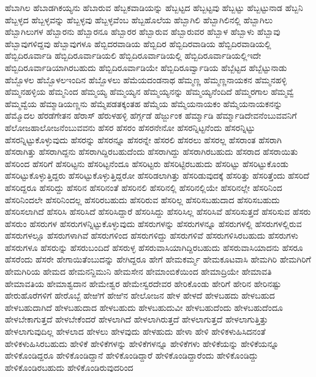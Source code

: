 {ಹೆಬಾಗಿಲ
ಹೆಬಾಡಗಿಕಯ್ಯನು
ಹೆಬಾರುವ
ಹೆಬ್ಬಕವಾಡಿಯನ್ನು
ಹೆಬ್ಬಟ್ಟದ
ಹೆಬ್ಬಟ್ಟವು
ಹೆಬ್ಬಟ್ಟು
ಹೆಬ್ಬಟ್ಟುನಾಡ
ಹೆಬ್ಬನಿ
ಹೆಬ್ಬಳ್ಳದ
ಹೆಬ್ಬಳ್ಳವನ್ನು
ಹೆಬ್ಬಳ್ಳವು
ಹೆಬ್ಬಳ್ಳವೆಂಬ
ಹೆಬ್ಬಹೊಲೆಯ
ಹೆಬ್ಬಾಗಿಲಿ
ಹೆಬ್ಬಾಗಿಲಿನಲ್ಲಿ
ಹೆಬ್ಬಾಗಿಲು
ಹೆಬ್ಬಾಗಿಲುಗಳ
ಹೆಬ್ಬಾರನು
ಹೆಬ್ಬಾರನೂ
ಹೆಬ್ಬಾರರ
ಹೆಬ್ಬಾರುವ
ಹೆಬ್ಬಾರುವರ
ಹೆಬ್ಬಾಳ
ಹೆಬ್ಬಾಳು
ಹೆಬ್ಬಾವು
ಹೆಬ್ಬಾವುಗಳಿದ್ದವು
ಹೆಬ್ಬಾವುಗಳೂ
ಹೆಬ್ಬಿದರವಾಡಿಯ
ಹೆಬ್ಬಿದಿರ
ಹೆಬ್ಬಿದಿರವಾಡಿಯ
ಹೆಬ್ಬಿದಿರವಾಡಿಯಲ್ಲಿ
ಹೆಬ್ಬಿದಿರೂರ್ವಾಡಿ
ಹೆಬ್ಬಿದಿರೂರ್ವಾಡಿಯಲಿ
ಹೆಬ್ಬಿದಿರೂರ್ವಾಡಿಯಲ್ಲಿ
ಹೆಬ್ಬಿದಿರೂರ್ವಾಡಿಯಲ್ಲಿಇದೇ
ಹೆಬ್ಬಿದಿರೂರ್ವಾಡಿಯಾಗಿರಬಹುದು
ಹೆಬ್ಬಿದಿರೂರ್ವಾಡಿಯೇ
ಹೆಬ್ಬಿದಿರೂರ್ವ್ವಾಡಿಯ
ಹೆಬ್ಬೆಟ್ಟದ
ಹೆಬ್ಬೆಟ್ಟುನಾಡು
ಹೆಬ್ಬೊಳಲ
ಹೆಬ್ಬೊಳಲಇಂದಿನ
ಹೆಬ್ಬೊಳಲು
ಹೆಮೆಯದಂಡನಾಥ
ಹೆಮ್ಮಣ್ಣ
ಹೆಮ್ಮಣ್ಣನಾಯಕನ
ಹೆಮ್ಮನಹಳ್ಳಿ
ಹೆಮ್ಮನಹಳ್ಳಿಯ
ಹೆಮ್ಮನಿಂದ
ಹೆಮ್ಮಯ್ಯ
ಹೆಮ್ಮಯ್ಯನ
ಹೆಮ್ಮಯ್ಯನನ್ನು
ಹೆಮ್ಮಯ್ಯನೆಂದಿದೆ
ಹೆಮ್ಮರಗಾಲ
ಹೆಮ್ಮವ್ವೆ
ಹೆಮ್ಮವ್ವೆಯ
ಹೆಮ್ಮಾಡಿಯಣ್ಣನು
ಹೆಮ್ಮೆಪಡತಕ್ಕಂತಹ
ಹೆಮ್ಮೆಯ
ಹೆಮ್ಮೆಯನಾಯಕಂ
ಹೆಮ್ಮೆಯನಾಯಕನನ್ನು
ಹೆಮ್ಮೊದಲ
ಹೆರಡೆಗೇತನ
ಹೆರಾಸ್
ಹೆರುಳಹಳ್ಳಿ
ಹೆರ್ಗ್ಗಡೆ
ಹೆರ್ಜ್ಜುಂಕ
ಹೆರ್ಮ್ಮಾಡಿ
ಹೆರ್ಮ್ಮಾಡಿದೇವನೆಂಬುವವನಿಗೆ
ಹೆಲೋಜಹಾಲೋಜನೆಂಬುವವನು
ಹೆಸರ
ಹೆಸರಂ
ಹೆಸರನೇನೋ
ಹೆಸರನ್ನಿಟ್ಟನೆಂದು
ಹೆಸರನ್ನಿಟ್ಟು
ಹೆಸರನ್ನಿಟ್ಟುಕೊಳ್ಳುವುದು
ಹೆಸರನ್ನು
ಹೆಸರನ್ನೂ
ಹೆಸರನ್ನೇ
ಹೆಸರಲಿ
ಹೆಸರಲು
ಹೆಸರಲ್ಲ
ಹೆಸರಾಂತ
ಹೆಸರಾಗಿ
ಹೆಸರಾಗಿತ್ತು
ಹೆಸರಾಗಿದ್ದನು
ಹೆಸರಾಗಿದ್ದಿರಬಹುದೆಂದು
ಹೆಸರಾಗಿದ್ದು
ಹೆಸರಾಗಿರಬಹುದು
ಹೆಸರಾದ
ಹೆಸರಾಯಿತು
ಹೆಸರಿಂದ
ಹೆಸರಿಗೆ
ಹೆಸರಿಟ್ಟನು
ಹೆಸರಿಟ್ಟನೆಂದೂ
ಹೆಸರಿಟ್ಟರು
ಹೆಸರಿಟ್ಟಿರಬಹುದು
ಹೆಸರಿಟ್ಟು
ಹೆಸರಿಟ್ಟುಕೊಂಡು
ಹೆಸರಿಟ್ಟುಕೊಳ್ಳುತ್ತಿದ್ದರು
ಹೆಸರಿಟ್ಟುಕೊಳ್ಳುತ್ತಿದ್ದರೋ
ಹೆಸರಿಡಲಾಗಿತ್ತು
ಹೆಸರಿಡುವುದಕ್ಕೆ
ಹೆಸರಿತ್ತು
ಹೆಸರಿತ್ತೆಂದು
ಹೆಸರಿದೆ
ಹೆಸರಿದ್ದರೂ
ಹೆಸರಿದ್ದು
ಹೆಸರಿನ
ಹೆಸರಿನಂತೆ
ಹೆಸರಿನಲಿ
ಹೆಸರಿನಲ್ಲಿ
ಹೆಸರಿನಲ್ಲಿಯೇ
ಹೆಸರಿನಲ್ಲೇ
ಹೆಸರಿನಿಂದ
ಹೆಸರಿನಿಂದಲೇ
ಹೆಸರಿನಿಂದಲ್ಲ
ಹೆಸರಿರಬಹುದು
ಹೆಸರಿರುವ
ಹೆಸರಿಲ್ಲ
ಹೆಸರಿಸಬಹುದಾದ
ಹೆಸರಿಸಬಹುದು
ಹೆಸರಿಸಲಾಗಿದೆ
ಹೆಸರಿಸಿ
ಹೆಸರಿಸಿದೆ
ಹೆಸರಿಸಿದ್ದಾರೆ
ಹೆಸರಿಸಿದ್ದು
ಹೆಸರಿಸಿಲ್ಲ
ಹೆಸರಿಸಿವೆ
ಹೆಸರಿಸುತ್ತದೆ
ಹೆಸರಿಸುವ
ಹೆಸರು
ಹೆಸರುಂ
ಹೆಸರುಗಳ
ಹೆಸರುಗಳನ್ನಿಟ್ಟುಕೊಳ್ಳುವುದು
ಹೆಸರುಗಳನ್ನು
ಹೆಸರುಗಳನ್ನೂ
ಹೆಸರುಗಳಲ್ಲಿ
ಹೆಸರುಗಳಲ್ಲಿರುವ
ಹೆಸರುಗಳಲ್ಲೂ
ಹೆಸರುಗಳಾಗಿವೆ
ಹೆಸರುಗಳಿಂದ
ಹೆಸರುಗಳಿದ್ದು
ಹೆಸರುಗಳಿವೆ
ಹೆಸರುಗಳಿಸಿರಬಹುದು
ಹೆಸರುಗಳು
ಹೆಸರುಗಳೂ
ಹೆಸರುನ್ನು
ಹೆಸರುಬಂದಿದೆ
ಹೆಸರುಳ್ಳ
ಹೆಸರುವಾಸಿಯಾಗಿದ್ದಿರಬಹುದು
ಹೆಸರುವಾಸಿಯಾದನು
ಹೆಸರೂ
ಹೆಸರೆಂದು
ಹೆಸರೇ
ಹೇಗಾಯಿತೆಂಬುದನ್ನು
ಹೇಗಿದ್ದರೂ
ಹೇಗೆ
ಹೇಮಕರ್ಮ್ಮ
ಹೇಮಕೂಟವಾಸಿ
ಹೇಮಗಿರಿ
ಹೇಮಗಿರಿಗೆ
ಹೇಮಗಿರಿಯ
ಹೇಮದ
ಹೇಮನನ್ದಿಮುನಿ
ಹೇಮಸೇನ
ಹೇಮಾಂಬಿಕೆಯಿಂದ
ಹೇಮಾದ್ರಿಯೇ
ಹೇಮಾವತಿ
ಹೇಮಾವತಿಯ
ಹೇಮಾಶ್ವದಾನ
ಹೇಮೇಶ್ವರ
ಹೇಮೇಸ್ವರದೇವರ
ಹೇರಿಕೊಂಡು
ಹೇರಿಗೆ
ಹೇರಿನ
ಹೇರಿನಷ್ಟು
ಹೇರುಹೊರೆಗಳಿಗೆ
ಹೇರೊಬ್ಬೆ
ಹೇಱಿಗೆ
ಹೇಱಿನ
ಹೇಲೋಜನ
ಹೇಳ
ಹೇಳದೆ
ಹೇಳಬಹದು
ಹೇಳಬಹುದ
ಹೇಳಬಹುದಾಗಿದೆ
ಹೇಳಬಹುದಾದ
ಹೇಳಬಹುದು
ಹೇಳಬಹುದುವೀ
ಹೇಳಬಹುದೆಂದು
ಹೇಳಬಹುದೆಂದೂ
ಹೇಳಬೇಕಾಗುತ್ತದೆ
ಹೇಳಬೇಕೆಂದರೆ
ಹೇಳಲಾಗಿದೆ
ಹೇಳಲಾಗಿರುತ್ತದೆ
ಹೇಳಲಾಗುತ್ತದೆ
ಹೇಳಲಾಗುತ್ತಿತ್ತು
ಹೇಳಲಾಗುವುದಿಲ್ಲ
ಹೇಳಲಾದ
ಹೇಳಲು
ಹೇಳವುದು
ಹೇಳಹುದು
ಹೇಳಾ
ಹೇಳಿ
ಹೇಳಿಕಳುಹಿಸಿದನಂತೆ
ಹೇಳಿಕಳುಹಿಸಿರಬಹುದು
ಹೇಳಿಕೆ
ಹೇಳಿಕೆಗಳನ್ನು
ಹೇಳಿಕೆಗಳನ್ನೂ
ಹೇಳಿಕೆಗಳು
ಹೇಳಿಕೆಯನ್ನು
ಹೇಳಿಕೆಯನ್ನೂ
ಹೇಳಿಕೊಂಡಿದ್ದರೂ
ಹೇಳಿಕೊಂಡಿದ್ದಾನೆ
ಹೇಳಿಕೊಂಡಿದ್ದಾರೆ
ಹೇಳಿಕೊಂಡಿದ್ದಾರೆಂದು
ಹೇಳಿಕೊಂಡಿದ್ದು
ಹೇಳಿಕೊಂಡಿರಬಹುದು
ಹೇಳಿಕೊಂಡಿರುವುದರಿಂದ
}
